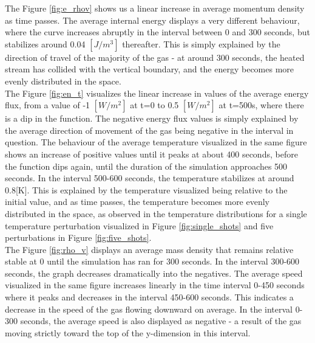 \documentclass[10pt, nofootinbib, twocolumn]{revtex4-1}
\begin{document}
The Figure \ref{fig:e_rhov} shows us a linear increase in average momentum density as time passes. The average internal energy displays a very different behaviour, where the curve increases abruptly in the interval between 0 and 300 seconds, but stabilizes around 0.04 $[J/m^3]$ thereafter. This is simply explained by the direction of travel of the majority of the gas - at around 300 seconds, the heated stream has collided with the vertical boundary, and the energy becomes more evenly distributed in the space. \\
\newpage
The Figure \ref{fig:en_t} visualizes the linear increase in values of the average energy flux, from a value of -1 $[W/m^2]$ at t=0 to 0.5 $[W/m^2]$ at t=500s, where there is a dip in the function. The negative energy flux values is simply explained by the average direction of movement of the gas being negative in the interval in question. The behaviour of the average temperature visualized in the same figure shows an increase of positive values until it peaks at about 400 seconds, before the function dips again, until the duration of the simulation approaches 500 seconds. In the interval 500-600 seconds, the temperature stabilizes at around 0.8[K]. This is explained by the temperature visualized being relative to the initial value, and as time passes, the temperature becomes more evenly distributed in the space, as observed in the temperature distributions for a single temperature perturbation visualized in Figure \ref{fig:single_shots} and five perturbations in Figure \ref{fig:five_shots}. \\

The Figure \ref{fig:rho_v} displays an average mass density that remains relative stable at 0 until the simulation has ran for 300 seconds. In the interval 300-600 seconds, the graph decreases dramatically into the negatives. The average speed visualized in the same figure increases linearly in the time interval 0-450 seconds where it peaks and decreases in the interval 450-600 seconds. This indicates a decrease in the speed of the gas flowing downward on average. In the interval 0-300 seconds, the average speed is also displayed as negative - a result of the gas moving strictly toward the top of the y-dimension in this interval. \\
\end{document}
